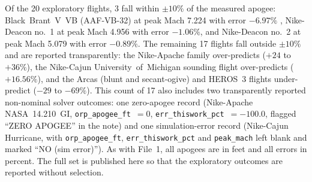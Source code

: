 Of the 20 exploratory flights, 3 fall within $\pm 10\%$ of the measured apogee:
Black~Brant~V~VB (AAF-VB-32) at peak Mach 7.224 with error $-6.97\%$
\cite{dtic_ad0733141}, Nike-Deacon no.~1 at peak Mach 4.956 with error
$-1.06\%$, and Nike-Deacon no.~2 at peak Mach 5.079 with error $-0.89\%$. The
remaining 17 flights fall outside $\pm 10\%$ and are reported transparently:
the Nike-Apache family over-predicts ($+24$ to $+36\%$), the Nike-Cajun
University~of~Michigan sounding flight over-predicts ($+16.56\%$), and the
Arcas (blunt and secant-ogive) and HEROS~3 flights under-predict ($-29$ to
$-69\%$). This count of 17 also includes two transparently reported
non-nominal solver outcomes: one zero-apogee record (Nike-Apache NASA~14.210~GI,
\texttt{orp\_apogee\_ft}~$=0$, \texttt{err\_thiswork\_pct}~$=-100.0$,
flagged ``ZERO APOGEE'' in the note) and one simulation-error record
(Nike-Cajun Hurricane, with \texttt{orp\_apogee\_ft},
\texttt{err\_thiswork\_pct} and \texttt{peak\_mach} left blank and marked
``NO (sim error)''). As with File~1, all apogees are in feet and all errors in
percent. The full set is published here so that the exploratory outcomes are
reported without selection.
